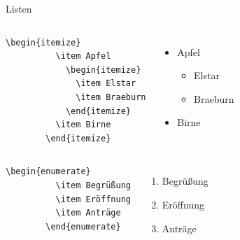 \begin{Frame}[fragile]{Listen}
  \begin{columns}
    \column{5cm}
      \begin{lstlisting}[gobble=8]
        \begin{itemize}
          \item Apfel
            \begin{itemize}
              \item Elstar
              \item Braeburn
            \end{itemize}
          \item Birne
        \end{itemize}
      \end{lstlisting}
    \column{4cm}
      \begin{itemize}
        \item Apfel
          \begin{itemize}
            \item Elstar
            \item Braeburn
          \end{itemize}
        \item Birne
      \end{itemize}
  \end{columns}
  
  \begin{columns}
    \column{5cm}
      \begin{lstlisting}[gobble=8]
        \begin{enumerate}
          \item Begrüßung
          \item Eröffnung
          \item Anträge
        \end{enumerate}
      \end{lstlisting}
    \column{4cm}
      \begin{enumerate}
        \item Begrüßung
        \item Eröffnung
        \item Anträge
      \end{enumerate}
  \end{columns}
\end{Frame}


